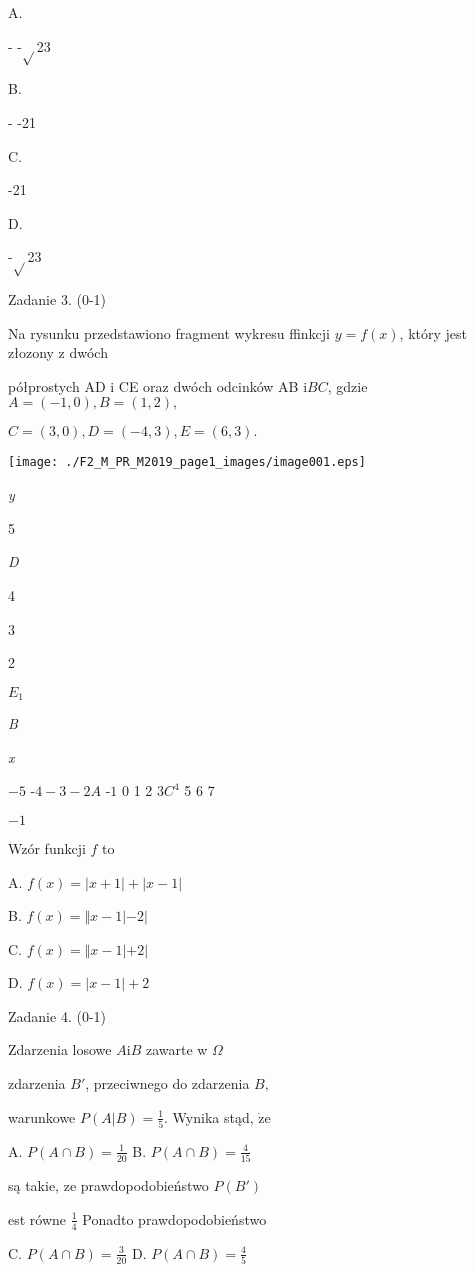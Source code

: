 \documentclass[a4paper,12pt]{article}
\begin{document}
A.

- -$\sqrt{}$23

B.

- -21

C.

-21

D.

-$\sqrt{}$23

Zadanie 3. (0-1)

Na rysunku przedstawiono fragment wykresu ffinkcji $y=f(x)$, który jest złozony z dwóch

półprostych AD $\mathrm{i}$ CE oraz dwóch odcinków AB $\mathrm{i} BC$, gdzie $A=(-1,0), B=(1,2),$

$C=(3,0), D=(-4,3), E=(6,3).$
\begin{center}
\texttt{[image: ./F2\_M\_PR\_M2019\_page1\_images/image001.eps]}
\end{center}
{\it y}

5

{\it D}

4

3

2

$E_{1}$

{\it B}

{\it x}

$-5$ -$4  -3  -2A$ -$1$  0  1 2  $3C^{4}$  5 6  7

$-1$

Wzór funkcji $f$ to

A. $f(x)=|x+1|+|x-1|$

B. $f(x)=\Vert x-1|-2|$

C. $f(x)=\Vert x-1|+2|$

D. $f(x)=|x-1|+2$

Zadanie 4. (0-1)

Zdarzenia losowe $A \mathrm{i} B$ zawarte w $\Omega$

zdarzenia $B'$, przeciwnego do zdarzenia $B,$

warunkowe $P(A|B)=\displaystyle \frac{1}{5}$. Wynika stąd, $\dot{\mathrm{z}}\mathrm{e}$

A. $P(A\displaystyle \cap B)=\frac{1}{20}$ B. $P(A\displaystyle \cap B)=\frac{4}{15}$

są takie, ze prawdopodobieństwo $P(B')$

est równe $\displaystyle \frac{1}{4}$ Ponadto prawdopodobieństwo

C. $P(A\displaystyle \cap B)=\frac{3}{20}$ D. $P(A\displaystyle \cap B)=\frac{4}{5}$
\end{document}
